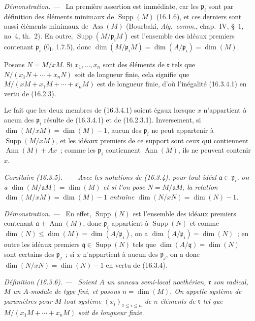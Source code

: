 \documentclass[10pt,oneside]{book}
\makeatletter
\newcommand{\setmanualcurrentlabel}[1]{\def\@currentlabel{#1}}
\newcommand{\oldpage}[2][]{%
  \setcounter{footnote}{0}%
  \marginpar{\scriptsize\textbf{#1}~|~#2}\ignorespaces}
\newenvironment{definition}[1][]{%
  \setmanualcurrentlabel{#1}\par\medskip\noindent\itshape Définition (#1). ---\ }{\par}
\newenvironment{corollary}[1][]{%
  \setmanualcurrentlabel{#1}\par\medskip\noindent\itshape Corollaire (#1). ---\ }{\par}
\newenvironment{proof}{%
  \par\medskip\noindent\textit{Démonstration. ---\ }}{\par}
\makeatother
\begin{document}
\begin{proof}
La première assertion est immédiate, car les $\mathfrak{p}_i$ sont par
définition des éléments minimaux de $\operatorname{Supp}(M)$ (16.1.6), et ces
derniers sont aussi éléments minimaux de $\operatorname{Ass}(M)$ (Bourbaki,
\emph{Alg.~comm.}, chap.~IV, \S~1, no~4, th.~2). En outre,
$\operatorname{Supp}(M/\mathfrak{p}_iM)$ est l'ensemble des idéaux premiers
contenant $\mathfrak{p}_i$ ($0_{\mathrm I}$, 1.7.5), donc
$\dim(M/\mathfrak{p}_iM)=\dim(A/\mathfrak{p}_i)=\dim(M)$.

Posons $N=M/xM$. Si $x_1,\ldots,x_n$ sont des éléments de $\mathfrak{r}$ tels
que $N/(x_1N+\cdots+x_nN)$ soit de longueur finie, cela signifie que
$M/(xM+x_1M+\cdots+x_nM)$ est de longueur finie, d'où l'inégalité (16.3.4.1)
en vertu de (16.2.3).

Le fait que les deux membres de (16.3.4.1) soient égaux lorsque $x$
n'appartient à aucun des $\mathfrak{p}_i$ résulte de (16.3.4.1) et de
(16.2.3.1). Inversement, si
\oldpage[0\textsubscript{IV-1}]{30}
$\dim(M/xM)=\dim(M)-1$, aucun des $\mathfrak{p}_i$ ne peut appartenir à
$\operatorname{Supp}(M/xM)$, et les idéaux premiers de ce support sont ceux
qui contiennent $\operatorname{Ann}(M)+Ax$~; comme les $\mathfrak{p}_i$
contiennent $\operatorname{Ann}(M)$, ils ne peuvent contenir $x$.
\end{proof}

\begin{corollary}[16.3.5]
\label{0.16.3.5-fr}
Avec les notations de (16.3.4), pour tout idéal
$\mathfrak{a}\subset\mathfrak{p}_i$, on a
$\dim(M/\mathfrak{a}M)=\dim(M)$ et si l'on pose
$N=M/\mathfrak{a}M$, la relation $\dim(M/xM)=\dim(M)-1$ entraîne
$\dim(N/xN)=\dim(N)-1$.
\end{corollary}

\begin{proof}
En effet, $\operatorname{Supp}(N)$ est l'ensemble des idéaux premiers
contenant $\mathfrak{a}+\operatorname{Ann}(M)$, donc $\mathfrak{p}_i$
appartient à $\operatorname{Supp}(N)$ et comme
$\dim(N)\leq\dim(M)=\dim(A/\mathfrak{p}_i)$, on a
$\dim(A/\mathfrak{p}_i)=\dim(N)$~; en outre les idéaux premiers
$\mathfrak{q}\in\operatorname{Supp}(N)$ tels que
$\dim(A/\mathfrak{q})=\dim(N)$ sont certains des $\mathfrak{p}_j$~; si $x$
n'appartient à aucun des $\mathfrak{p}_j$, on a donc
$\dim(N/xN)=\dim(N)-1$ en vertu de (16.3.4).
\end{proof}

\begin{definition}[16.3.6]
\label{0.16.3.6-fr}
Soient $A$ un anneau semi-local noethérien, $\mathfrak{r}$ son radical, $M$ un
$A$-module de type fini, et posons $n=\dim(M)$. On appelle \emph{système de
paramètres pour $M$} tout système $(x_i)_{1\leq i\leq n}$ de $n$ éléments de
$\mathfrak{r}$ tel que $M/(x_1M+\cdots+x_nM)$ soit de longueur finie.
\end{definition}
\end{document}
